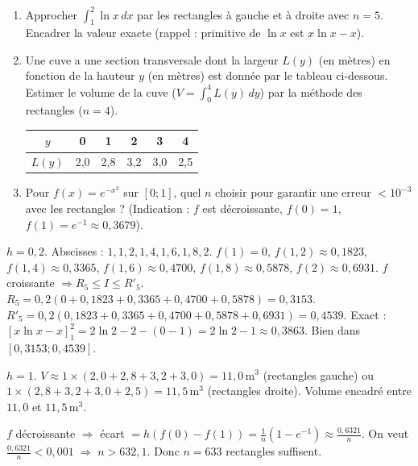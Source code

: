\documentclass[11pt]{article}
\begin{document}
\begin{exercice}[Entraînement]
\begin{enumerate}
    \item Approcher $\displaystyle\int_1^2 \ln x\,dx$ par les rectangles à gauche et à droite avec $n=5$. Encadrer la valeur exacte (rappel : primitive de $\ln x$ est $x\ln x - x$).
    \item Une cuve a une section transversale dont la largeur $L(y)$ (en mètres) en fonction de la hauteur $y$ (en mètres) est donnée par le tableau ci-dessous. Estimer le volume de la cuve ($V = \int_0^4 L(y)\,dy$) par la méthode des rectangles ($n=4$).
    \begin{center}
    \begin{tabular}{|c|ccccc|}\hline
    $y$ & 0 & 1 & 2 & 3 & 4 \\ \hline
    $L(y)$ & 2,0 & 2,8 & 3,2 & 3,0 & 2,5 \\ \hline
    \end{tabular}
    \end{center}
    \item Pour $f(x)=e^{-x^2}$ sur $[0;1]$, quel $n$ choisir pour garantir une erreur $< 10^{-3}$ avec les rectangles ? (Indication : $f$ est décroissante, $f(0)=1$, $f(1)=e^{-1}\approx 0,3679$).
\end{enumerate}
\end{exercice}

\begin{corrige}[Exercice 1]
$h=0,2$. Abscisses : $1, 1,2, 1,4, 1,6, 1,8, 2$. 
$f(1)=0$, $f(1,2)\approx0,1823$, $f(1,4)\approx0,3365$, $f(1,6)\approx0,4700$, $f(1,8)\approx0,5878$, $f(2)\approx0,6931$.
$f$ croissante $\Rightarrow R_5 \le I \le R'_5$.
$R_5 = 0,2(0+0,1823+0,3365+0,4700+0,5878) = 0,3153$.
$R'_5 = 0,2(0,1823+0,3365+0,4700+0,5878+0,6931) = 0,4539$.
Exact : $[x\ln x-x]_1^2 = 2\ln2-2 - (0-1) = 2\ln2-1 \approx 0,3863$. Bien dans $[0,3153; 0,4539]$.
\end{corrige}

\begin{corrige}[Exercice 2]
$h=1$. $V \approx 1\times(2,0+2,8+3,2+3,0) = 11,0\,\text{m}^3$ (rectangles gauche) ou $1\times(2,8+3,2+3,0+2,5) = 11,5\,\text{m}^3$ (rectangles droite). Volume encadré entre $11,0$ et $11,5\,\text{m}^3$.
\end{corrige}

\begin{corrige}[Exercice 3]
$f$ décroissante $\Rightarrow$ écart $= h(f(0)-f(1)) = \frac{1}{n}(1-e^{-1}) \approx \frac{0,6321}{n}$.
On veut $\frac{0,6321}{n} < 0,001 \;\Rightarrow\; n > 632,1$. Donc $n = 633$ rectangles suffisent.
\end{corrige}
\end{document}

